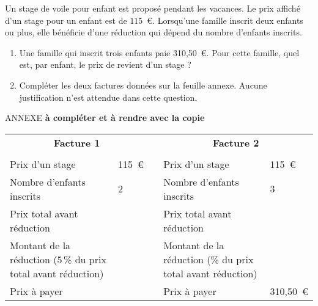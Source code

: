 
\medskip
 
Un stage de voile pour enfant est proposé pendant les vacances. Le prix affiché d'un stage pour un enfant est de $115$~\euro. 
Lorsqu'une famille inscrit deux enfants ou plus, elle bénéficie d'une réduction qui dépend du nombre d'enfants inscrits.

\medskip
 
\begin{enumerate}
\item Une famille qui inscrit trois enfants paie 310,50~\euro. Pour cette famille, quel est, par enfant, le prix de revient d'un stage ? 
\item Compléter les deux factures données sur la feuille annexe. Aucune justification n'est attendue dans cette question.
\end{enumerate}


\begin{center}
ANNEXE \textbf{à compléter et à rendre avec la copie}

\vspace{1cm}
\renewcommand\arraystretch{2}
\begin{tabularx}{\linewidth}{|X|m{1.75cm}|c|X|m{1.75cm}|} 
\multicolumn{2}{c}{\textbf{Facture 1}}&\multicolumn{1}{c}{\quad}&\multicolumn{2}{c}{\textbf{Facture 2}}\\
\multicolumn{2}{c}{\quad}&\multicolumn{1}{c}{\quad}&\multicolumn{2}{c}{\quad}\\  \cline{1-2}\cline{4-5} 
Prix d'un stage &115~\euro& &Prix d'un stage&115~\euro\\ \cline{1-2}\cline{4-5}  
Nombre d'enfants inscrits &2&\qquad&Nombre d'enfants inscrits &3\\   \cline{1-2}\cline{4-5}
Prix total avant réduction &\dotfill& &Prix total avant réduction& 
\dotfill\\  \cline{1-2}\cline{4-5} 
Montant de la réduction (5\,\% du prix total avant réduction) &\dotfill& &Montant de la réduction (\dotfill \% du prix total avant réduction)&\dotfill\\  \cline{1-2}\cline{4-5} 
Prix à payer &\dotfill& & Prix à payer &310,50~\euro\\ \cline{1-2}\cline{4-5}
\end{tabularx} 
\end{center}

\bigskip 

